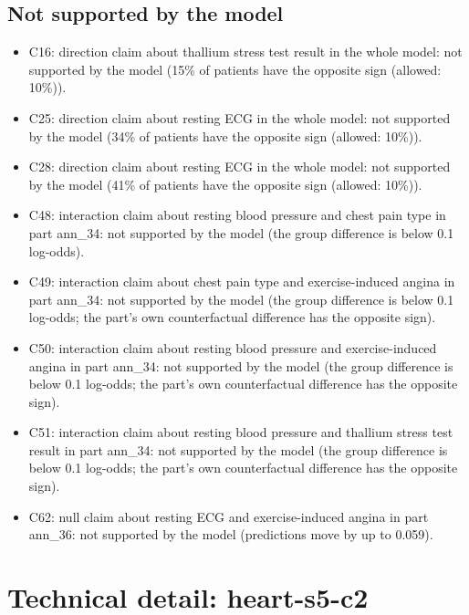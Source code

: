 \documentclass[a4paper,10pt]{article}
\newif\ifreviewmarks
\newcommand{\reviewrule}{\noindent{\color{BrickRed}\rule{\linewidth}{0.8pt}}}
\newenvironment{drafted}[1][]{%
  \ifreviewmarks\par\addvspace{\medskipamount}\reviewrule\par\nopagebreak
  \noindent{\color{BrickRed}\sffamily\footnotesize\textbf{Thesis Draft}\quad #1\hfill review}\par\nopagebreak\smallskip\fi}{%
  \ifreviewmarks\par\smallskip\noindent{\color{BrickRed}\sffamily\footnotesize end of thesis draft}\par\nopagebreak\reviewrule\par\medskip\fi}
\begin{document}
\begin{drafted}[plain-language layer: heart-s5-c2]
\subsection{Not supported by the model}
\begin{itemize}\setlength\itemsep{0pt}\small
\item C16: direction claim about thallium stress test result in the whole model: not supported by the model (15\% of patients have the opposite sign (allowed: 10\%)).
\item C25: direction claim about resting ECG in the whole model: not supported by the model (34\% of patients have the opposite sign (allowed: 10\%)).
\item C28: direction claim about resting ECG in the whole model: not supported by the model (41\% of patients have the opposite sign (allowed: 10\%)).
\item C48: interaction claim about resting blood pressure and chest pain type in part ann\_\allowbreak{}34: not supported by the model (the group difference is below 0.1 log-odds).
\item C49: interaction claim about chest pain type and exercise-induced angina in part ann\_\allowbreak{}34: not supported by the model (the group difference is below 0.1 log-odds; the part's own counterfactual difference has the opposite sign).
\item C50: interaction claim about resting blood pressure and exercise-induced angina in part ann\_\allowbreak{}34: not supported by the model (the group difference is below 0.1 log-odds; the part's own counterfactual difference has the opposite sign).
\item C51: interaction claim about resting blood pressure and thallium stress test result in part ann\_\allowbreak{}34: not supported by the model (the group difference is below 0.1 log-odds; the part's own counterfactual difference has the opposite sign).
\item C62: null claim about resting ECG and exercise-induced angina in part ann\_\allowbreak{}36: not supported by the model (predictions move by up to 0.059).
\end{itemize}
\clearpage\section*{Technical detail: heart-s5-c2}
\renewcommand{\thesubsection}{T.\arabic{subsection}}\setcounter{subsection}{0}

\end{drafted}
\end{document}
